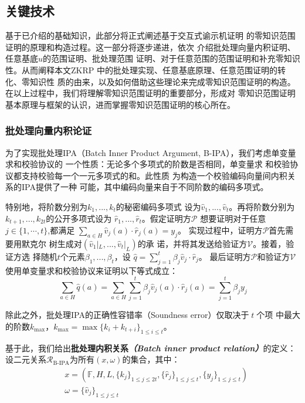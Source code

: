 \documentclass[zihao=-4]{ctexart}
\begin{document}
\subsection{关键技术}

基于已介绍的基础知识，此部分将正式阐述基于交互式谕示机证明
的零知识范围证明的原理和构造过程。这一部分将逐步递进，依次
介绍批处理向量内积证明、任意基底$u$的范围证明、批处理范围
证明、对于任意范围的范围证明和补充零知识性。从而阐释本文ZKRP
中的批处理实现、任意基底原理、任意范围证明的转化、零知识性
质的由来，以及如何借助这些理论来完成零知识范围证明的构造。
在以上过程中，我们将理解零知识范围证明的重要部分，形成对
零知识范围证明基本原理与框架的认识，进而掌握零知识范围证明的核心所在。
\subsubsection{批处理向量内积论证}
为了实现批处理IPA（Batch Inner Product Argument, B-IPA），我们考虑单变量求和校验协议的
一个性质：无论多个多项式的阶数是否相同，单变量求
和校验协议都支持校验每一个一元多项式的和\cite{six}。此性质
为构造一个校验编码向量间内积关系的IPA提供了一种
可能，其中编码向量来自于不同阶数的编码多项式。\par
特别地，将阶数分别为$k_1,...,k_t$的秘密编码多项式
设为$\hat{v}_1,...,\hat{v}_t$。再将阶数分别为
$k_{t+1},...,k_{2t}$的公开多项式设为
$\hat{r}_1,...,\hat{r}_t$。假定证明方$\mathcal{P}$
想要证明对于任意$j \in \{1,\cdots,t\}$,都满足
$\sum_{a\in H}\hat{v}_j(a)\cdot\hat{r}_j(a)=y_j$。
实现过程中，证明方$\mathcal{P}$首先需要用默克尔
树生成对$(\hat{v}_1|_L,...,\hat{v}_t|_L)$的承
诺，并将其发送给验证方$\mathcal{V}$。接着，验证方选
择随机$t$个元素$\beta_1,...,\beta_t$，设
$\hat{q}=\sum\limits_{j=1}^t\beta_j\hat{v}_j\cdot\hat{r}_j$。
最后证明方$\mathcal{P}$和验证方$\mathcal{V}$
使用单变量求和校验协议来证明以下等式成立：
\begin{equation}\sum_{a\in H}\hat{q}(a)=\sum_{a\in H}\sum\limits_{j=1}^t\beta_j\hat{v}_j(a)\cdot\hat{r}_j(a)=\sum\limits_{j=1}^t\beta_jy_j\label{B-IPA和校验}\end{equation}\par
除此之外，批处理IPA的正确性容错率（Soundness error）仅取决于$\;t\;$个项
中最大的阶数$k_{\max}$，$k_{\max}=\max\{k_i+k_{t+i}\}_{1\le i\le t}$。\par
基于此，我们给出\textbf{批处理内积关系\emph{（Batch inner product relation）}}的定义：设二元关系$\mathcal{R}_{\text{B-IPA}}$为所有$(x,\omega)$的集合，其中：
\[\begin{aligned}&x=(\mathbb{F},H,L,\{k_j\}_{1\le j\le2t},\{\hat{r}_j\}_{1\le j\le t},\{y_j\}_{1\le j\le t})\\&\omega=\{\hat{v}_j\}_{1\le j\le t}\end{aligned}\]\par
\end{document}
